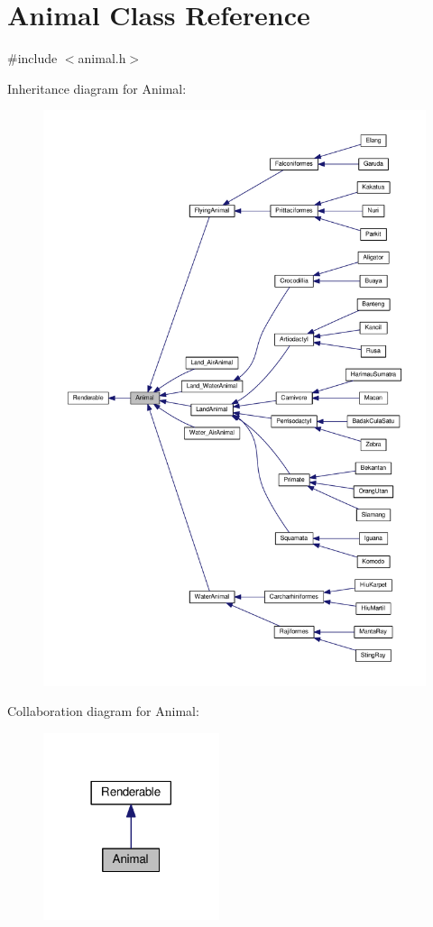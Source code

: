 \hypertarget{classAnimal}{}\section{Animal Class Reference}
\label{classAnimal}


{\ttfamily \#include $<$animal.\+h$>$}



Inheritance diagram for Animal\+:
\nopagebreak
\begin{figure}[H]
\begin{center}
\leavevmode
\includegraphics[width=350pt]{classAnimal__inherit__graph}
\end{center}
\end{figure}


Collaboration diagram for Animal\+:
\nopagebreak
\begin{figure}[H]
\begin{center}
\leavevmode
\includegraphics[width=146pt]{classAnimal__coll__graph}
\end{center}
\end{figure}
